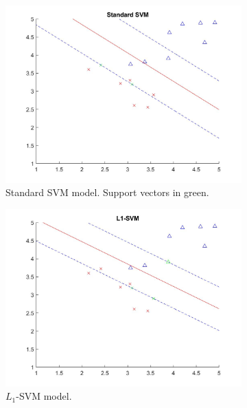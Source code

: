 \documentclass[11pt]{article}
\begin{document}
\begin{figure}[hbt!]
	\begin{subfigure}{.5\textwidth}
		\centering
		\captionsetup{font=footnotesize}
		\includegraphics[width=\linewidth]{stand}
		\caption{Standard SVM model. Support vectors in green.}
	\end{subfigure}
	\begin{subfigure}{.5\textwidth}
		\centering
		\captionsetup{font=footnotesize}
		\includegraphics[width=\linewidth]{l1}
		\caption{$L_1$-SVM model.}
	\end{subfigure}
	\newline
	\begin{subfigure}{.5\textwidth}
		\centering
		\captionsetup{font=footnotesize}

\end{subfigure}
\end{figure}
\end{document}
